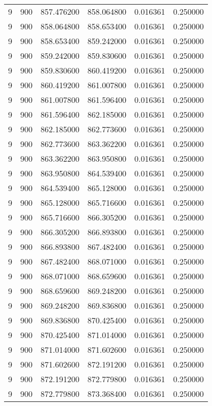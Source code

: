 \begin{longtable}{rrrrrr}
9 & 900 & 857.476200 & 858.064800 & 0.016361 & 0.250000 \\
9 & 900 & 858.064800 & 858.653400 & 0.016361 & 0.250000 \\
9 & 900 & 858.653400 & 859.242000 & 0.016361 & 0.250000 \\
9 & 900 & 859.242000 & 859.830600 & 0.016361 & 0.250000 \\
9 & 900 & 859.830600 & 860.419200 & 0.016361 & 0.250000 \\
9 & 900 & 860.419200 & 861.007800 & 0.016361 & 0.250000 \\
9 & 900 & 861.007800 & 861.596400 & 0.016361 & 0.250000 \\
9 & 900 & 861.596400 & 862.185000 & 0.016361 & 0.250000 \\
9 & 900 & 862.185000 & 862.773600 & 0.016361 & 0.250000 \\
9 & 900 & 862.773600 & 863.362200 & 0.016361 & 0.250000 \\
9 & 900 & 863.362200 & 863.950800 & 0.016361 & 0.250000 \\
9 & 900 & 863.950800 & 864.539400 & 0.016361 & 0.250000 \\
9 & 900 & 864.539400 & 865.128000 & 0.016361 & 0.250000 \\
9 & 900 & 865.128000 & 865.716600 & 0.016361 & 0.250000 \\
9 & 900 & 865.716600 & 866.305200 & 0.016361 & 0.250000 \\
9 & 900 & 866.305200 & 866.893800 & 0.016361 & 0.250000 \\
9 & 900 & 866.893800 & 867.482400 & 0.016361 & 0.250000 \\
9 & 900 & 867.482400 & 868.071000 & 0.016361 & 0.250000 \\
9 & 900 & 868.071000 & 868.659600 & 0.016361 & 0.250000 \\
9 & 900 & 868.659600 & 869.248200 & 0.016361 & 0.250000 \\
9 & 900 & 869.248200 & 869.836800 & 0.016361 & 0.250000 \\
9 & 900 & 869.836800 & 870.425400 & 0.016361 & 0.250000 \\
9 & 900 & 870.425400 & 871.014000 & 0.016361 & 0.250000 \\
9 & 900 & 871.014000 & 871.602600 & 0.016361 & 0.250000 \\
9 & 900 & 871.602600 & 872.191200 & 0.016361 & 0.250000 \\
9 & 900 & 872.191200 & 872.779800 & 0.016361 & 0.250000 \\
9 & 900 & 872.779800 & 873.368400 & 0.016361 & 0.250000 \\

\end{longtable}
